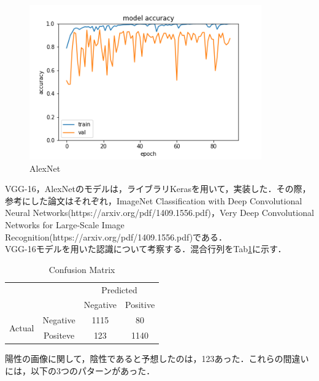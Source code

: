 \documentclass[11pt,a4j]{jarticle}
\begin{document}
\begin{figure}[ht]
	\centering
	\includegraphics[width=10cm]{../2_MedicalImageClassification/Model/AlexNet_acc.png}
	\vspace{-0.5cm}
	\renewcommand{\figurename}{Fig}
	\caption{AlexNet}
	\label{AlexNet}
\end{figure}

VGG-16，AlexNetのモデルは，ライブラリKerasを用いて，実装した．その際，参考にした論文はそれぞれ，ImageNet Classification with Deep Convolutional Neural Networks(https://arxiv.org/pdf/1409.1556.pdf)，Very Deep Convolutional Networks for Large-Scale Image Recognition(https://arxiv.org/pdf/1409.1556.pdf)である．\\

VGG-16モデルを用いた認識について考察する．混合行列をTab\ref{cm}に示す．

\begin{table}[ht]
	\centering
	\renewcommand{\tablename}{Tab}
	\caption{Confusion Matrix}
	\vspace{0.5cm}
	\begin{tabular}{cc|c|c|}
	\cline{3-4}
	                                              &          & \multicolumn{2}{c|}{Predicted} \\ \cline{3-4} 
	                                              &          & Negative       & Positive      \\ \hline
	\multicolumn{1}{|c|}{\multirow{2}{*}{Actual}} & Negative & 1115           & 80            \\ \cline{2-4} 
	\multicolumn{1}{|c|}{}                        & Positeve & 123            & 1140          \\ \hline
	\end{tabular}
	\label{cm}
\end{table}

陽性の画像に関して，陰性であると予想したのは，123あった．これらの間違いには，以下の3つのパターンがあった．
\end{document}
